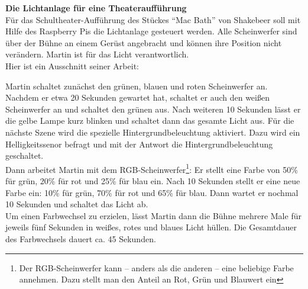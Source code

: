 \documentclass[11pt, a4paper]{article}
\begin{document}
\textbf{{\Large Die Lichtanlage für eine Theateraufführung}}\\

Für das Schultheater-Aufführung des Stückes \enquote{Mac Bath} von Shakebeer soll mit Hilfe des Raspberry Pis die Lichtanlage gesteuert werden. Alle Scheinwerfer sind über der Bühne an einem Gerüst angebracht und können ihre Position nicht verändern. Martin ist für das Licht verantwortlich. \\

Hier ist ein Ausschnitt seiner Arbeit:
\begin{mdframed}
Martin schaltet zunächst den grünen, blauen und roten Scheinwerfer an. Nachdem er etwa 20 Sekunden gewartet hat, schaltet er auch den weißen Scheinwerfer an und schaltet den grünen aus. Nach weiteren  10 Sekunden lässt er die gelbe Lampe kurz blinken und schaltet dann das gesamte Licht aus. Für die nächste Szene wird die spezielle Hintergrundbeleuchtung aktiviert. Dazu wird ein Helligkeitssenor befragt und mit der Antwort die Hintergrundbeleuchtung geschaltet.\\

Dann arbeitet Martin mit dem RGB-Scheinwerfer\footnote{Der RGB-Scheinwerfer kann -- anders als die anderen -- eine beliebige Farbe annehmen. Dazu stellt man den Anteil an Rot, Grün und Blauwert ein}: Er stellt eine Farbe von 50\% für grün, 20\% für rot und 25\% für blau ein. Nach 10 Sekunden stellt er eine neue Farbe ein: 10\% für grün, 70\% für rot und 65\% für blau. Dann wartet er nochmal 10 Sekunden und schaltet das Licht ab.\\

Um einen Farbwechsel zu erzielen, lässt Martin dann die Bühne mehrere Male für jeweils fünf Sekunden in weißes, rotes und blaues Licht hüllen. Die Gesamtdauer des Farbwechsels dauert ca. 45 Sekunden.\\
\end{mdframed}
\end{document}
